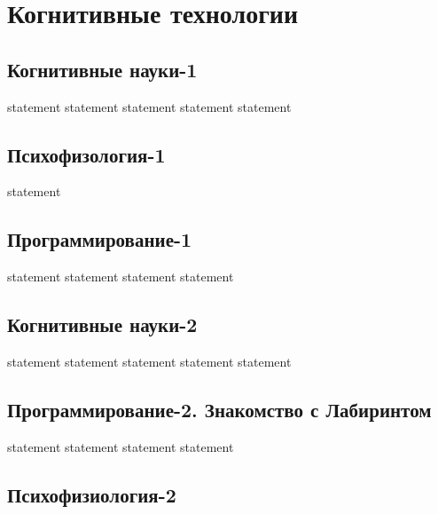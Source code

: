 \chapter{Когнитивные технологии}

\section{Когнитивные науки-1}

{statement}
{statement}
{statement}
{statement}
{statement}

\section{Психофизология-1}

{statement}

\section{Программирование-1}

{statement}
{statement}
{statement}
{statement}

\section{Когнитивные науки-2}

{statement}
{statement}
{statement}
{statement}
{statement}

\section{Программирование-2. Знакомство с Лабиринтом}

{statement}
{statement}
{statement}
{statement}

\section{Психофизиология-2}

